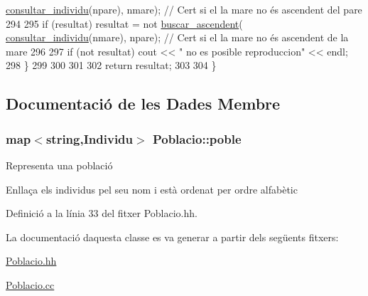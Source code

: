 \begin{DoxyCode}
      \hyperlink{class_poblacio_a0574c7b81e2b8329fb2ffcd0b4365a98}{consultar\_individu}(npare), nmare); \textcolor{comment}{// Cert si el la mare no és ascendent del pare}
294         
295         \textcolor{keywordflow}{if} (resultat) resultat = not \hyperlink{class_poblacio_aec49e868f8a0373f575ff86579e4f9ad}{buscar\_ascendent}(
      \hyperlink{class_poblacio_a0574c7b81e2b8329fb2ffcd0b4365a98}{consultar\_individu}(nmare), npare); \textcolor{comment}{// Cert si el la mare no és ascendent de la mare}
296         
297         \textcolor{keywordflow}{if} (not resultat) cout << \textcolor{stringliteral}{"  no es posible reproduccion"} << endl;
298     \}
299     
300     
301     
302     \textcolor{keywordflow}{return} resultat;
303     
304 \}
\end{DoxyCode}


\subsection{Documentació de les Dades Membre}
\subsubsection[{\texorpdfstring{poble}{poble}}]{\setlength{\rightskip}{0pt plus 5cm}map$<$string,{\bf Individu}$>$ Poblacio\+::poble\hspace{0.3cm}{\ttfamily [private]}}\hypertarget{class_poblacio_adc5549ea0f51e16440bc4cf0928b0d50}{}\label{class_poblacio_adc5549ea0f51e16440bc4cf0928b0d50}


Representa una població 

Enllaça els individus pel seu nom i està ordenat per ordre alfabètic 

Definició a la línia 33 del fitxer Poblacio.\+hh.



La documentació d\textquotesingle{}aquesta classe es va generar a partir dels següents fitxers\+:\begin{DoxyCompactItemize}
\item 
\hyperlink{_poblacio_8hh}{Poblacio.\+hh}\item 
\hyperlink{_poblacio_8cc}{Poblacio.\+cc}\end{DoxyCompactItemize}
